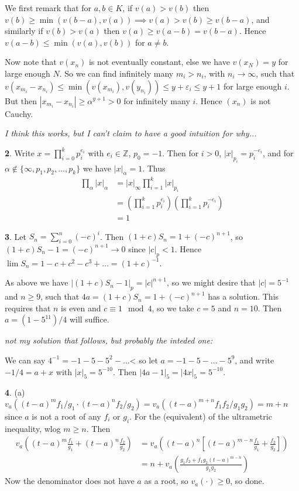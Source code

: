 \documentclass[]{article}
\theoremstyle{custhm}
\theoremstyle{cusdef}
\theoremstyle{custhm}
\theoremstyle{custhm}
\theoremstyle{custhm}
\theoremstyle{custhm}
\theoremstyle{cusdef}
\theoremstyle{remark}
\newcommand{\Z}{\mathbb{Z}}
\newcommand{\ra}{\rightarrow}
\newcommand{\eps}{\varepsilon}
\renewcommand{\it}[1]{\textit{#1}}
\begin{document}
We first remark that for $a,b\in K$, if $v(a) > v(b)$ then $v(b)\ge \min(v(b-a),v(a))\implies v(a)>v(b)\ge v(b-a)$, and similarly if $v(b) > v(a)$ then $v(a) \ge v(a-b) = v(b-a)$. Hence $v(a-b) \le \min(v(a),v(b))$ for $a\ne b$.

Now note that $v(x_n)$ is not eventually constant, else we have $v(x_N) = y$ for large enough $N$. So we can find infinitely many $m_i > n_i$, with $n_i\ra \infty$, such that $v(x_{m_i} - x_{n_i}) \le \min(v(x_{m_i}),v(y_{n_i})) \le y + \eps_i \le y + 1$ for large enough $i$. But then $|x_{m_i} - x_{n_i}| \ge \alpha^{y+1} > 0$ for infinitely many $i$. Hence $(x_n)$ is not Cauchy.

\it{I think this works, but I can't claim to have a good intuition for why...}

\textbf{2}. Write $x = \prod_{i=0}^{k}p_i^{e_i}$ with $e_i\in \Z$, $p_0 = -1$. Then for $i>0$, $|x|_{p_i} = p_i^{-e_i}$, and for $\alpha\not\in \{\infty,p_1,p_2,\dots,p_k\}$ we have $|x|_{\alpha} = 1$. Thus
\begin{align*}
	\prod_{\alpha}|x|_{\alpha} &= |x|_{\infty}\prod_{i=1}^{k}|x|_{p_i}\\
	&=\left(\prod_{i=1}^{k}p_i^{e_i}\right)\left(\prod_{i=1}^{k}p_i^{-e_i}\right)\\
	&= 1
\end{align*}

\textbf{3}. Let $S_n = \sum_{i=0}^{n}(-c)^i$. Then $(1+c)S_n = 1+(-c)^{n+1}$, so $(1+c)S_n - 1 = (-c)^{n+1}\ra 0$ since $|c|_p < 1$. Hence $\lim S_n = 1 - c + c^2 - c^3 + \dots = (1+c)^{-1}$.

As above we have $|(1+c)S_n - 1|_p = |c|^{n+1}$, so we might desire that $|c| = 5^{-1}$ and $n \ge 9$, such that $4a = (1+c)S_n = 1 + (-c)^{n+1}$ has a solution. This requires that $n$ is even and $c \equiv 1\mod 4$, so we take $c = 5$ and $n = 10$. Then $a = (1-5^{11})/4$ will suffice.

\it{not my solution that follows, but probably the inteded one:}

We can say $4^{-1} = -1 - 5 - 5^2-\dots$< so let $a = -1-5-\dots-5^9$, and write $-1/4 = a + x$ with $|x|_{5} = 5^{-10}$. Then $|4a-1|_5 = |4x|_5 = 5^{-10}$.

\textbf{4}. (a) $v_a((t-a)^mf_1/g_1\cdot (t-a)^nf_2/g_2) = v_a((t-a)^{m+n}f_1f_2/g_1g_2) = m + n$ since $a$ is not a root of any $f_i$ or $g_i$. For the (equivalent) of the ultrametric inequality, wlog $m\ge n$. Then
\begin{align*}
	v_a\left((t-a)^m\frac{f_1}{g_1} + (t-a)^n\frac{f_2}{g_2}\right) &= v_a\left((t-a)^n\left[(t-a)^{m-n}\frac{f_1}{g_1} + \frac{f_2}{g_2}\right]\right)\\
	&=n + v_a\left(\frac{g_1f_2+f_1g_2(t-a)^{m-n}}{g_1g_2}\right)
\end{align*}
Now the denominator does not have $a$ as a root, so $v_a(\cdot)\ge 0$, so done.
\end{document}
